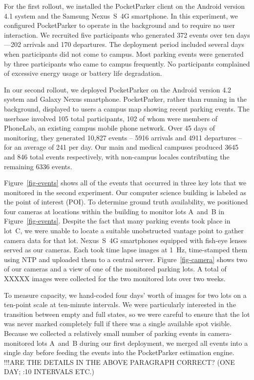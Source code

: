 For the first rollout, we installed the PocketParker client on the Android
version 4.1 system and the Samsung Nexus~S~4G smartphone.  In this
experiment, we configured PocketParker to operate in the background and to
require no user interaction.   We recruited five participants who generated
372 events over ten days---202 arrivals and 170 departures.  The deployment
period included several days when participants did not come to campus.  Most
parking events were generated by three participants who came to campus
frequently.  No participants complained of excessive energy usage or battery
life degradation.

In our second rollout, we deployed PocketParker on the Android version 4.2
system and Galaxy Nexus smartphone.  PocketParker, rather than running in the
background, displayed to users a campus map showing recent parking events.
The userbase involved 105 total participants, 102 of whom were members of
PhoneLab, an existing campus mobile phone network.  Over 45 days of 
monitoring, they generated 10,827 events -- 5916 arrivals and 4911 
departures -- for an average of 241 per day.  Our main and medical 
campuses produced 3645 and 846 total events respectively, with non-campus 
locales contributing the remaining 6336 events.

Figure~\ref{fig-events} shows all of the events that occurred in three key
lots that we monitored in the second experiment. Our computer science
building is labeled as the point of interest (POI). To determine ground
truth availability, we positioned four cameras at locations within the
building to monitor lots A~and~B in Figure~\ref{fig-events}.  Despite the fact
that many parking events took place in lot~C, we were unable to locate a
suitable unobstructed vantage point to gather camera data for that lot.
Nexus~S~4G smartphones equipped with fish-eye lenses served as our cameras.
Each took time lapse images at 1~Hz, time-stamped them using NTP and uploaded
them to a central server. Figure~\ref{fig-camera} shows two of our cameras
and a view of one of the monitored parking lots. A total of XXXXX images
were collected for the two monitored lots over two weeks.

To measure capacity, we hand-coded four days' worth of images for two lots on
a ten-point scale at ten-minute intervals. We were particularly interested
in the transition between empty and full states, so we were careful to ensure
that the lot was never marked completely full if there was a single available
spot visible. Because we collected a relatively small number of parking events
in camera-monitored lots A~and~B during our first deployment, we merged all
events into a single day before feeding the events into the PocketParker
estimation engine.
!!!ARE THE DETAILS IN THE ABOVE PARAGRAPH CORRECT?  (ONE DAY; :10 INTERVALS ETC.)

